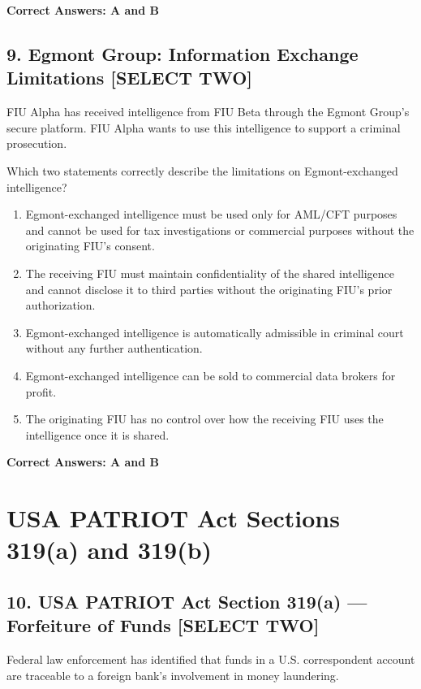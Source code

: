 \documentclass[11pt,a4paper]{article}
\begin{document}
	\textbf{Correct Answers: A and B}
	
	\subsection{9. Egmont Group: Information Exchange Limitations \textnormal{[SELECT TWO]}}
	
	FIU Alpha has received intelligence from FIU Beta through the Egmont Group's secure platform. FIU Alpha wants to use this intelligence to support a criminal prosecution.
	
	Which two statements correctly describe the limitations on Egmont-exchanged intelligence?
	
	\begin{enumerate}[label=\Alph*.]
		\item Egmont-exchanged intelligence must be used only for AML/CFT purposes and cannot be used for tax investigations or commercial purposes without the originating FIU's consent.
		\item The receiving FIU must maintain confidentiality of the shared intelligence and cannot disclose it to third parties without the originating FIU's prior authorization.
		\item Egmont-exchanged intelligence is automatically admissible in criminal court without any further authentication.
		\item Egmont-exchanged intelligence can be sold to commercial data brokers for profit.
		\item The originating FIU has no control over how the receiving FIU uses the intelligence once it is shared.
	\end{enumerate}
	
	\textbf{Correct Answers: A and B}
	
	\section{USA PATRIOT Act Sections 319(a) and 319(b)}
	
	\subsection{10. USA PATRIOT Act Section 319(a) — Forfeiture of Funds \textnormal{[SELECT TWO]}}
	
	Federal law enforcement has identified that funds in a U.S. correspondent account are traceable to a foreign bank's involvement in money laundering.
	
\end{document}
